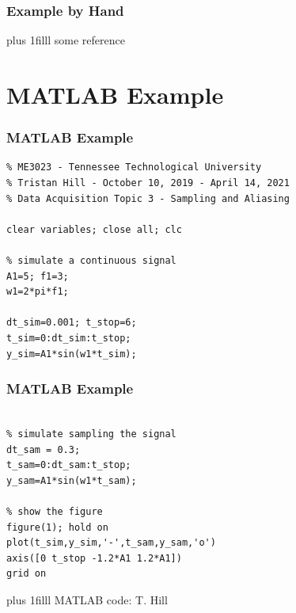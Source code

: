 \documentclass[fleqn]{beamer} %
\newcommand{\sectiontitleIII}{Example by Hand}
\newcommand{\sectiontitleIV}{MATLAB Example}
\newcommand{\btVFill}{\vskip0pt plus 1filll}
\begin{document}
\begin{frame}[label=sectionIII] \small
\frametitle{\sectiontitleIII}
\bigskip


\btVFill
\tiny{some reference}	
\end{frame}

\section{\sectiontitleIV}	

\begin{frame}[containsverbatim,label=sectionIV] \small
\frametitle{\sectiontitleIV}
\bigskip

\begin{lstlisting}
% ME3023 - Tennessee Technological University 
% Tristan Hill - October 10, 2019 - April 14, 2021
% Data Acquisition Topic 3 - Sampling and Aliasing

clear variables; close all; clc

% simulate a continuous signal
A1=5; f1=3;
w1=2*pi*f1;

dt_sim=0.001; t_stop=6;
t_sim=0:dt_sim:t_stop;
y_sim=A1*sin(w1*t_sim);
\end{lstlisting}


\end{frame}

\begin{frame}[containsverbatim,label=sectionIV] \small
\frametitle{\sectiontitleIV}
\bigskip

\begin{lstlisting}

% simulate sampling the signal
dt_sam = 0.3;
t_sam=0:dt_sam:t_stop;
y_sam=A1*sin(w1*t_sam);

% show the figure
figure(1); hold on
plot(t_sim,y_sim,'-',t_sam,y_sam,'o')
axis([0 t_stop -1.2*A1 1.2*A1])
grid on
\end{lstlisting}


\btVFill
\tiny{MATLAB code: T. Hill}	
\end{frame}
\end{document}
